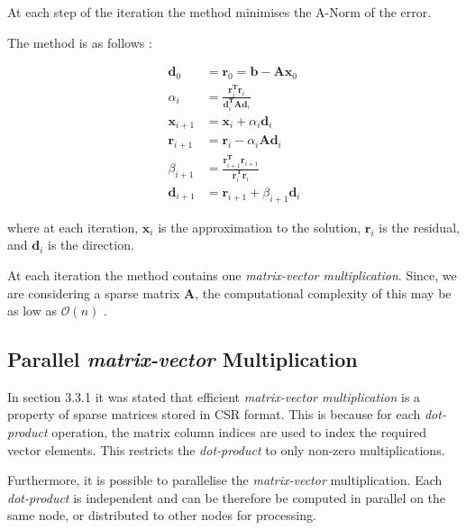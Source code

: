 At each step of the iteration the method minimises the A-Norm of the error.

The method is as follows \cite{cg-without-pain}:

\begin{align}
\mathbf{d}_0 &= \mathbf{r}_0 = \mathbf{b} - \mathbf{A}\mathbf{x}_0 \\
\alpha_i &= \frac{\mathbf{r}_i^{\mathbf{T}}\mathbf{r}_i}{\mathbf{d}_i^{\mathbf{T}}\mathbf{A}\mathbf{d}_i} \\
\mathbf{x}_{i+1} &= \mathbf{x}_i + \alpha_i \mathbf{d}_i \\
\mathbf{r}_{i+1} &= \mathbf{r}_i - \alpha_i \mathbf{A} \mathbf{d}_i \\
\beta_{i+1} &= \frac{\mathbf{r}_{i+1}^\mathbf{T} \mathbf{r}_{i+1}}{\mathbf{r}_{i}^\mathbf{T} \mathbf{r}_{i}} \\
\mathbf{d}_{i+1} &= \mathbf{r}_{i+1} + \beta_{i+1}\mathbf{d}_i
\end{align}

where at each iteration, $\mathbf{x}_i$ is the approximation to the solution, $\mathbf{r}_i$ is the residual, and $\mathbf{d}_i$ is the direction. 

At each iteration the method contains one \emph{matrix-vector multiplication}. Since, we are considering a sparse matrix $\mathbf{A}$, the computational complexity of this may be as low as $\mathcal{O}(n)$ \cite{numerical-linear-algebra}.


%
%
\subsection{Parallel \emph{matrix-vector} Multiplication}

In section 3.3.1 it was stated that efficient \emph{matrix-vector multiplication} is a property of sparse matrices stored in CSR format. This is because for each \emph{dot-product} operation, the matrix column indices are used to index the required vector elements. This restricts the \emph{dot-product} to only non-zero multiplications.

Furthermore, it is possible to parallelise the \emph{matrix-vector} multiplication. Each \emph{dot-product} is independent and can be therefore be computed in parallel on the same node, or distributed to other nodes for processing.











